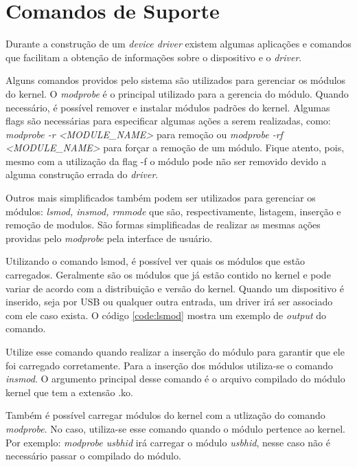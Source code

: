 \section{Comandos de Suporte}
\label{utils}
Durante a construção de um \textit{device driver} existem algumas aplicações e comandos que facilitam
a obtenção de informações sobre o dispositivo e o \textit{driver}.

Alguns comandos providos pelo sistema são utilizados para gerenciar os módulos do kernel.
O \textit{modprobe} é o principal utilizado para a gerencia do módulo. Quando necessário, é possível
remover e instalar módulos padrões do kernel. Algumas flags são necessárias para especificar
algumas ações a serem realizadas, como: \textit{modprobe -r <MODULE\_NAME>} para remoção ou 
\textit{modprobe -rf <MODULE\_NAME>} para forçar a remoção de um módulo. Fique atento, pois, mesmo
com a utilização da flag -f o módulo pode não ser removido devido a alguma construção errada
do \textit{driver}.

Outros mais simplificados também podem ser utilizados para gerenciar os módulos: \textit{lsmod, insmod, rmmode}
que são, respectivamente, listagem, inserção e remoção de modulos. São formas simplificadas
de realizar as mesmas ações providas pelo \textit{modprobe} pela interface de usuário.

Utilizando o comando lsmod, é possível ver quais os módulos que estão carregados. Geralmente são
os módulos que já estão contido no kernel e pode variar de acordo com a distribuição e versão do
kernel. Quando um dispositivo é inserido, seja por USB ou qualquer outra entrada, um driver irá
ser associado com ele caso exista. O código \ref{code:lsmod} mostra um exemplo de \textit{output} do comando.

\lstset{style=terminal}


Utilize esse comando quando realizar a inserção do módulo para garantir que ele foi carregado
corretamente. Para a inserção dos módulos utiliza-se o comando \textit{insmod}. O argumento principal desse
comando é o arquivo compilado do módulo kernel que tem a extensão .ko.

\lstset{style=terminal}


Também é possível carregar módulos do kernel com a utlização do comando \textit{modprobe}. No caso, utiliza-se
esse comando quando o módulo pertence ao kernel. Por exemplo: \textit{modprobe usbhid} irá carregar o módulo
\textit{usbhid}, nesse caso não é necessário passar o compilado do módulo.

